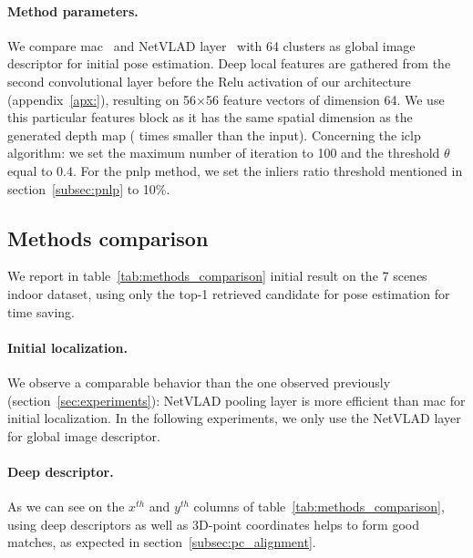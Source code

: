 
\paragraph{Method parameters.} We compare \ac{mac}~\citep{Razavian2014a} and NetVLAD layer~\citep{Arandjelovic2017} with 64 clusters as global image descriptor for initial pose estimation. Deep local features are gathered from the second convolutional layer before the Relu activation of our architecture (appendix~\ref{apx:}), resulting on 56$\times$56 feature vectors of dimension 64. We use this particular features block as it has the same spatial dimension as the generated depth map ( times smaller than the input). Concerning the \ac{iclp} algorithm: we set the maximum number of iteration to 100 and the threshold $\theta$ equal to $0.4$. For the \ac{pnlp} method, we set the inliers ratio threshold mentioned in section~\ref{subsec:pnlp} to 10\%.

\subsection{Methods comparison}


We report in table~\ref{tab:methods_comparison} initial result on the 7 scenes indoor dataset, using only the top-1 retrieved candidate for pose estimation for time saving. 

\paragraph{Initial localization.} We observe a comparable behavior than the one observed previously (section~\ref{sec:experiments}): NetVLAD pooling layer is more efficient than \ac{mac} for initial localization. In the following experiments, we only use the NetVLAD layer for global image descriptor. 

\paragraph{Deep descriptor.}
As we can see on the $x^{th}$ and $y^{th}$ columns of table~\ref{tab:methods_comparison}, using deep descriptors as well as 3D-point coordinates helps to form good matches, as expected in section~\ref{subsec:pc_alignment}.

